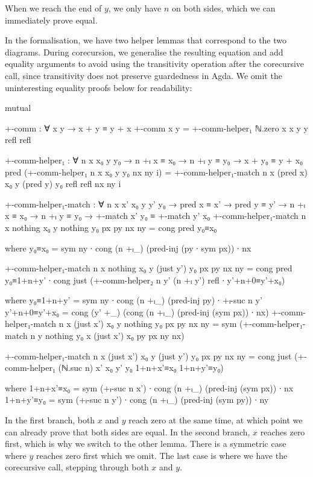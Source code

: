 When we reach the end of $y$, we only have $n$ on both sides, which we can
immediately prove equal.

In the formalisation, we have two helper lemmas that correspond to the two
diagrams. During corecursion, we generalise the resulting equation and add
equality arguments to avoid using the transitivity operation after the
corecursive call, since transitivity does not preserve guardedness in Agda. We omit
the uninteresting equality proofs below for readability:
\begin{AgdaSuppressSpace}
\begin{code}[hide]
mutual
\end{code}
\begin{code}
  +-comm : ∀ x y → x + y ≡ y + x
  +-comm x y = +-comm-helper₁ ℕ.zero x x y y refl refl

  +-comm-helper₁ :
    ∀ n x x₀ y y₀ → n +ₗ x ≡ x₀ → n +ₗ y ≡ y₀ →
    x + y₀ ≡ y + x₀
  pred (+-comm-helper₁ n x x₀ y y₀ nx ny i) =
    +-comm-helper₁-match n x (pred x) x₀ y (pred y) y₀
      refl refl nx ny i

  +-comm-helper₁-match :
    ∀ n x x' x₀ y y' y₀ →
    pred x ≡ x' → pred y ≡ y' →
    n +ₗ x ≡ x₀ → n +ₗ y ≡ y₀ →
    +-match x' y₀ ≡ +-match y' x₀
  +-comm-helper₁-match
    n x nothing x₀ y nothing y₀ px py nx ny =
      cong pred y₀≡x₀
\end{code}
\begin{code}[hide]
      where
      y₀≡x₀ = sym ny ∙ cong (n +ₗ_) (pred-inj (py ∙ sym px)) ∙ nx
\end{code}
\begin{code}
  +-comm-helper₁-match
    n x nothing x₀ y (just y') y₀ px py nx ny =
      cong pred y₀≡1+n+y' ∙
      cong just
        (+-comm-helper₂ n y' (n +ₗ y') refl ∙ y'+n+0≡y'+x₀)
\end{code}
\begin{code}[hide]
    where
    y₀≡1+n+y' = sym ny ∙ cong (n +ₗ_) (pred-inj py) ∙ +ₗ-suc n y'
    y'+n+0≡y'+x₀ = cong (y' +_) (cong (n +ₗ_) (pred-inj (sym px)) ∙ nx)
  +-comm-helper₁-match
    n x (just x') x₀ y nothing y₀ px py nx ny =
      sym (+-comm-helper₁-match n y nothing y₀ x (just x') x₀ py px ny nx)
\end{code}
\begin{code}
  +-comm-helper₁-match
    n x (just x') x₀ y (just y') y₀ px py nx ny =
      cong just
        (+-comm-helper₁ (ℕ.suc n) x' x₀ y' y₀
          1+n+x'≡x₀ 1+n+y'≡y₀)
\end{code}
\begin{code}[hide]
    where
    1+n+x'≡x₀ = sym (+ₗ-suc n x') ∙ cong (n +ₗ_) (pred-inj (sym px)) ∙ nx
    1+n+y'≡y₀ = sym (+ₗ-suc n y') ∙ cong (n +ₗ_) (pred-inj (sym py)) ∙ ny
\end{code}
\end{AgdaSuppressSpace}
In the first branch, both $x$ and $y$ reach zero at the same time, at which
point we can already prove that both sides are equal. In the second branch, $x$
reaches zero first, which is why we switch to the other lemma. There is a
symmetric case where $y$ reaches zero first which we omit. The last case is
where we have the corecursive call, stepping through both $x$ and $y$.

